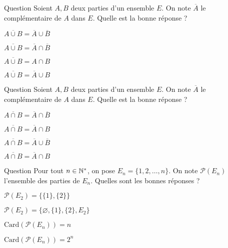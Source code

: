 \begin{multi}[multiple,feedback=
{D'abord \(x\in A\cup B \Leftrightarrow (x\in A\) ou \(x\in B\)). Les lois de De Morgan donnent donc que \((x\notin A\cup B)\Leftrightarrow (x\notin A\) et \(x\notin B\)), c'est-à-dire \(\overline{A\cup B}=\overline{A}\cap \overline{B}\).
}]{Question}
Soient \(A,B\) deux parties d'un ensemble \(E\). On note \(\overline{A}\) le complémentaire de \(A\) dans \(E\). Quelle est la bonne réponse ?

    \item \(\overline{A\cup B}=\overline{A}\cup \overline{B}\)
    \item* \(\overline{A\cup B}=\overline{A}\cap \overline{B}\)
    \item \(\overline{A\cup B}=A\cap B\)
    \item \(\overline{A\cup B}=\overline{A}\cup B\)
\end{multi}


\begin{multi}[multiple,feedback=
{D'abord \(x\in A\cap B \Leftrightarrow (x\in A\) et \(x\in B\)). Les lois de De Morgan donnent donc que \((x\notin A\cap B)\Leftrightarrow (x\notin A\) ou \(x\notin B\)), c'est-à-dire \(\overline{A\cap B}=\overline{A}\cup \overline{B}\).
}]{Question}
Soient \(A,B\) deux parties d'un ensemble \(E\). On note \(\overline{A}\) le complémentaire de \(A\) dans \(E\). Quelle est la bonne réponse ?

    \item \(\overline{A\cap B}=\overline{A}\cap \overline{B}\)
    \item \(\overline{A\cap B}=\overline{A}\cap B\)
    \item* \(\overline{A\cap B}=\overline{A}\cup \overline{B}\)
    \item \(\overline{A\cap B}=\overline{A}\cap B\)
\end{multi}


\begin{multi}[multiple,feedback=
{Le nombre de parties à \(k\) éléments de \(E_n\) est \(\mathrm{C}^k_n\) et le nombre de toutes les parties de \(E_n\) est \(\displaystyle \sum _{k=0}^n\mathrm{C}^k_n=(1+1)^n=2^n\).
}]{Question}
Pour tout \(n\in \mathbb{N} ^*\), on pose \(E_n=\{1,2,\dots ,n\}\). On note \(\mathcal{P}(E_n)\) l'ensemble des parties de \(E_n\). Quelles sont les bonnes réponses ?

    \item \(\mathcal{P}(E_2)=\{\{1\},\{2\}\}\)
    \item* \(\mathcal{P}(E_2)=\{\varnothing ,\{1\},\{2\},E_2\}\)
    \item \(\mathrm{Card}(\mathcal{P}(E_n))=n\)
    \item* \(\mathrm{Card}(\mathcal{P}(E_n))=2^n\)
\end{multi}


